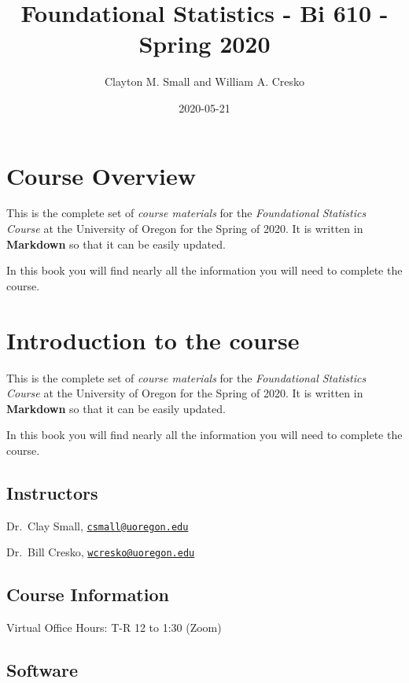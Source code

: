 \documentclass[]{book}
\title{Foundational Statistics - Bi 610 - Spring 2020}
\author{Clayton M. Small and William A. Cresko}
\date{2020-05-21}
\begin{document}
\maketitle

{
\setcounter{tocdepth}{1}
\tableofcontents
}
\hypertarget{course-overview}{%
\chapter{Course Overview}\label{course-overview}}

This is the complete set of \emph{course materials} for the \emph{Foundational Statistics Course} at the University of Oregon for the Spring of 2020. It is written in \textbf{Markdown} so that it can be easily updated.

In this book you will find nearly all the information you will need to complete the course.

\hypertarget{introduction-to-the-course}{%
\chapter{Introduction to the course}\label{introduction-to-the-course}}

This is the complete set of \emph{course materials} for the \emph{Foundational Statistics Course} at the University of Oregon for the Spring of 2020. It is written in \textbf{Markdown} so that it can be easily updated.

In this book you will find nearly all the information you will need to complete the course.

\hypertarget{instructors}{%
\section{Instructors}\label{instructors}}

Dr.~Clay Small, \href{mailto:csmall@uoregon.edu}{\nolinkurl{csmall@uoregon.edu}}

Dr.~Bill Cresko, \href{mailto:wcresko@uoregon.edu}{\nolinkurl{wcresko@uoregon.edu}}

\hypertarget{course-information}{%
\section{Course Information}\label{course-information}}

Virtual Office Hours: T-R 12 to 1:30 (Zoom)

\hypertarget{software}{%
\section{Software}\label{software}}
\end{document}
